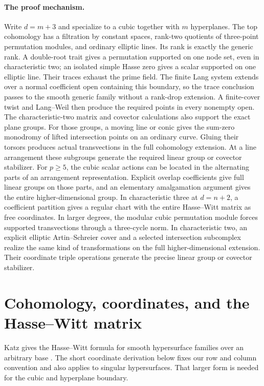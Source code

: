 \documentclass[11pt]{article}
\begin{document}
\paragraph{The proof mechanism.}
Write $d=m+3$ and specialize to a cubic together with $m$ hyperplanes. The top cohomology has a filtration by constant spaces, rank-two quotients of three-point permutation modules, and ordinary elliptic lines. Its rank is exactly the generic rank. A double-root trait gives a permutation supported on one node set, even in characteristic two; an isolated simple Hasse zero gives a scalar supported on one elliptic line. Their traces exhaust the prime field. The finite Lang system extends over a normal coefficient open containing this boundary, so the trace conclusion passes to the smooth generic family without a rank-drop extension. A finite-cover twist and Lang--Weil then produce the required points in every nonempty open. The characteristic-two matrix and covector calculations also support the exact plane groups. For those groups, a moving line or conic gives the sum-zero monodromy of lifted intersection points on an ordinary curve. Gluing their torsors produces actual transvections in the full cohomology extension. At a line arrangement these subgroups generate the required linear group or covector stabilizer. For $p\ge5$, the cubic scalar actions can be located in the alternating parts of an arrangement representation. Explicit overlap coefficients give full linear groups on those parts, and an elementary amalgamation argument gives the entire higher-dimensional group. In characteristic three at $d=n+2$, a coefficient partition gives a regular chart with the entire Hasse--Witt matrix as free coordinates. In larger degrees, the modular cubic permutation module forces supported transvections through a three-cycle norm. In characteristic two, an explicit elliptic Artin--Schreier cover and a selected intersection subcomplex realize the same kind of transformations on the full higher-dimensional extension. Their coordinate triple operations generate the precise linear group or covector stabilizer.

\section{Cohomology, coordinates, and the Hasse--Witt matrix}\label{sec:pn-1}

Katz gives the Hasse--Witt formula for smooth hypersurface families over an arbitrary base \citep[\S2.3.7, pp.~33--36, especially Algorithm~2.3.7.14]{Katz1972}. The short coordinate derivation below fixes our row and column convention and also applies to singular hypersurfaces. That larger form is needed for the cubic and hyperplane boundary.
\end{document}
